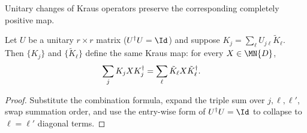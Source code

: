 Unitary changes of Kraus operators preserve the corresponding completely
positive map.

\begin{theorem}\label{thm:kraus_same_map_of_unitary_combination}
    \leanok
    Let $U$ be a unitary $r \times r$ matrix ($U^\dagger U = \Id$)
    and suppose $K_j = \sum_\ell U_{j\ell} \tilde{K}_\ell$.
    Then $\{K_j\}$ and $\{\tilde{K}_\ell\}$ define the same Kraus map:
    for every $X \in \MN{D}$,
    \begin{align}
        \sum_j K_j X K_j^\dagger
        &= \sum_\ell \tilde{K}_\ell X \tilde{K}_\ell^\dagger.
        \notag
    \end{align}
\end{theorem}

\begin{proof}
    \leanok
    Substitute the combination formula, expand the triple sum over
    $j,\ell,\ell'$, swap summation order, and use the entry-wise form
    of $U^\dagger U = \Id$ to collapse to $\ell = \ell'$ diagonal terms.
\end{proof}

